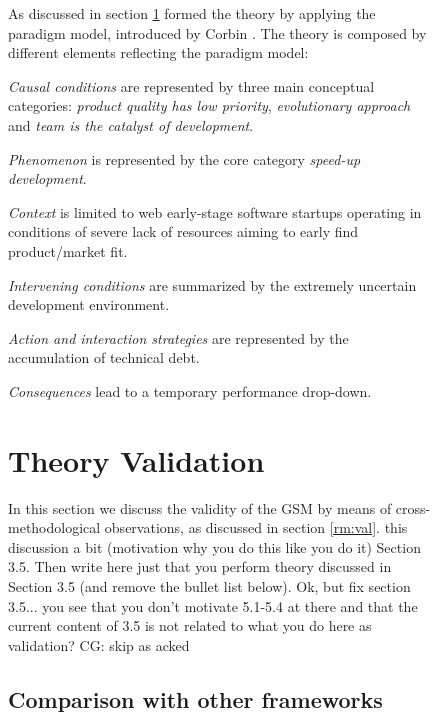\documentclass[12pt,journal,compsoc]{../sty/IEEEtran}
\begin{document}
\begin{table}[!t]
\begin{figure}[!t]
\begin{compactitem}
As discussed in section \ref{res:val} %
formed the theory by applying the paradigm model, introduced by Corbin
\cite{Corbin1990}. The theory is composed by different elements reflecting the
paradigm model:

\begin{compactitem}

\item \textit{Causal conditions} are represented by three main conceptual
categories: \textit{product quality has low priority}, \textit{evolutionary
approach} and \textit{team is the catalyst of development}. \item
\textit{Phenomenon} is represented by the core category \textit{speed-up
development}. \item \textit{Context} is limited to web early-stage software
startups  operating in conditions of severe lack of resources aiming to early
find  product/market fit. \item \textit{Intervening conditions} are  summarized
by the extremely  uncertain development environment. \item \textit{Action and
interaction strategies} are represented by the  accumulation of technical debt.
\item \textit{Consequences} lead to a temporary performance drop-down.
\end{compactitem}

\section{Theory Validation} \label{res:val}

In this section we discuss the validity of the GSM by means of  cross-
methodological observations, as discussed in section \ref{rm:val}. %
this discussion a bit (motivation why you do this like you do it)  %
Section 3.5. Then write here just that you perform theory  %
discussed in Section 3.5 (and remove the bullet list below). %
Ok, but fix section 3.5... you see that you don't motivate 5.1-5.4 at  %
there and that the current content of 3.5 is not related to what you  %
do here as validation? CG: skip as acked


\subsection{Comparison with other frameworks}
\label{sect:theory:validation:others}


\end{compactitem}
\end{figure}
\end{table}
\end{document}

